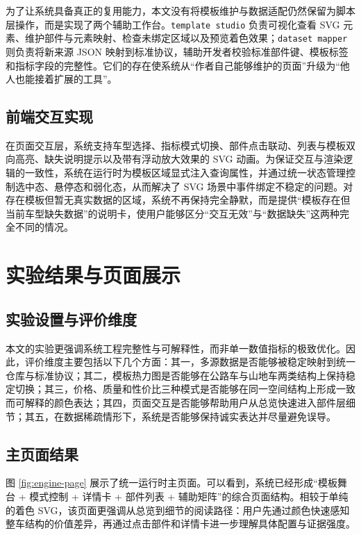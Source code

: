 \documentclass[12pt,hyperref,a4paper,UTF8]{ctexart}
\begin{document}
为了让系统具备真正的复用能力，本文没有将模板维护与数据适配仍然保留为脚本层操作，而是实现了两个辅助工作台。\texttt{template studio} 负责可视化查看 SVG 元素、维护部件与元素映射、检查未绑定区域以及预览着色效果；\texttt{dataset mapper} 则负责将新来源 JSON 映射到标准协议，辅助开发者校验标准部件键、模板标签和指标字段的完整性。它们的存在使系统从“作者自己能够维护的页面”升级为“他人也能接着扩展的工具”。

\subsection{前端交互实现}

在页面交互层，系统支持车型选择、指标模式切换、部件点击联动、列表与模板双向高亮、缺失说明提示以及带有浮动放大效果的 SVG 动画。为保证交互与渲染逻辑的一致性，系统在运行时为模板区域显式注入查询属性，并通过统一状态管理控制选中态、悬停态和弱化态，从而解决了 SVG 场景中事件绑定不稳定的问题。对存在模板但暂无真实数据的区域，系统不再保持完全静默，而是提供“模板存在但当前车型缺失数据”的说明卡，使用户能够区分“交互无效”与“数据缺失”这两种完全不同的情况。

\section{实验结果与页面展示}

\subsection{实验设置与评价维度}

本文的实验更强调系统工程完整性与可解释性，而非单一数值指标的极致优化。因此，评价维度主要包括以下几个方面：其一，多源数据是否能够被稳定映射到统一仓库与标准协议；其二，模板热力图是否能够在公路车与山地车两类结构上保持稳定切换；其三，价格、质量和性价比三种模式是否能够在同一空间结构上形成一致而可解释的颜色表达；其四，页面交互是否能够帮助用户从总览快速进入部件层细节；其五，在数据稀疏情形下，系统是否能够保持诚实表达并尽量避免误导。

\subsection{主页面结果}

图 \ref{fig:engine-page} 展示了统一运行时主页面。可以看到，系统已经形成“模板舞台 + 模式控制 + 详情卡 + 部件列表 + 辅助矩阵”的综合页面结构。相较于单纯的着色 SVG，该页面更强调从总览到细节的阅读路径：用户先通过颜色快速感知整车结构的价值差异，再通过点击部件和详情卡进一步理解具体配置与证据强度。
\end{document}
